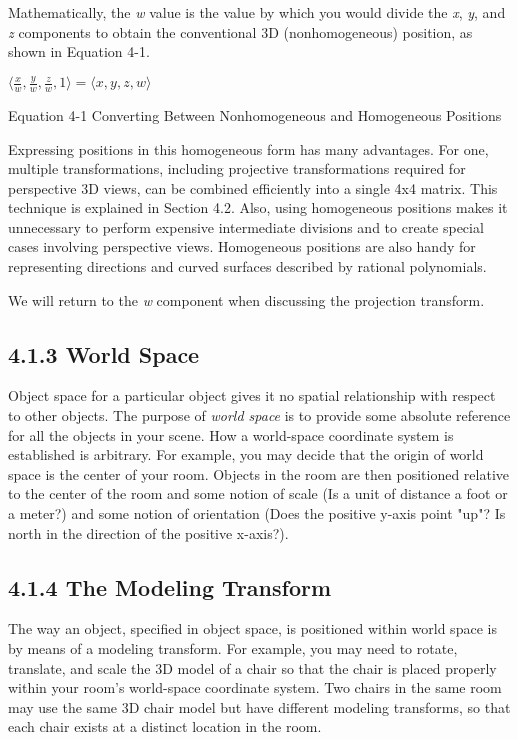 \documentclass[../main.tex]{subfiles}
\begin{document}
Mathematically, the \textit{w} value is the value by which you would divide the \textit{x}, \textit{y}, and \textit{z} components to obtain the conventional 3D (nonhomogeneous) position, as shown in Equation 4-1.

\FloatBarrier
\begin{equationcaption}
$
\langle \frac{x}{w},\frac{y}{w},\frac{z}{w},1 \rangle = \langle x,y,z,w \rangle
$
\caption{Equation 4-1 Converting Between Nonhomogeneous and Homogeneous Positions}
\end{equationcaption}
\FloatBarrier

Expressing positions in this homogeneous form has many advantages. For one, multiple transformations, including projective transformations required for perspective 3D views, can be combined efficiently into a single 4x4 matrix. This technique is explained in Section 4.2. Also, using homogeneous positions makes it unnecessary to perform expensive intermediate divisions and to create special cases involving perspective views. Homogeneous positions are also handy for representing directions and curved surfaces described by rational polynomials.

We will return to the \textit{w} component when discussing the projection transform.

\subsection{4.1.3 World Space}

Object space for a particular object gives it no spatial relationship with respect to other objects. The purpose of \textit{world space} is to provide some absolute reference for all the objects in your scene. How a world-space coordinate system is established is arbitrary. For example, you may decide that the origin of world space is the center of your room. Objects in the room are then positioned relative to the center of the room and some notion of scale (Is a unit of distance a foot or a meter?) and some notion of orientation (Does the positive y-axis point "up"? Is north in the direction of the positive x-axis?).

\subsection{4.1.4 The Modeling Transform}

The way an object, specified in object space, is positioned within world space is by means of a modeling transform. For example, you may need to rotate, translate, and scale the 3D model of a chair so that the chair is placed properly within your room's world-space coordinate system. Two chairs in the same room may use the same 3D chair model but have different modeling transforms, so that each chair exists at a distinct location in the room.
\end{document}
